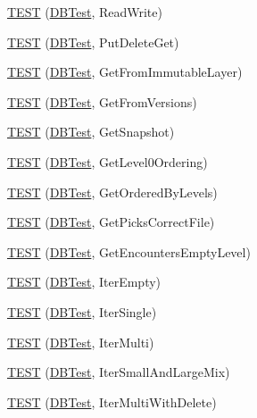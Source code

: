\begin{DoxyCompactItemize}
\hyperlink{namespaceleveldb_a2d427ecc9d7b712d8c5dd7ec8b6343fc}{T\+E\+S\+T} (\hyperlink{classleveldb_1_1_d_b_test}{D\+B\+Test}, Read\+Write)
\item 
\hyperlink{namespaceleveldb_a4d273f5f0d313440832363179e28e010}{T\+E\+S\+T} (\hyperlink{classleveldb_1_1_d_b_test}{D\+B\+Test}, Put\+Delete\+Get)
\item 
\hyperlink{namespaceleveldb_a21cac1755bd447df075909132bb964d4}{T\+E\+S\+T} (\hyperlink{classleveldb_1_1_d_b_test}{D\+B\+Test}, Get\+From\+Immutable\+Layer)
\item 
\hyperlink{namespaceleveldb_affd937ddc8c138fd0b5d020a396310c8}{T\+E\+S\+T} (\hyperlink{classleveldb_1_1_d_b_test}{D\+B\+Test}, Get\+From\+Versions)
\item 
\hyperlink{namespaceleveldb_ad6fac95495278565df640d4055b9c9f0}{T\+E\+S\+T} (\hyperlink{classleveldb_1_1_d_b_test}{D\+B\+Test}, Get\+Snapshot)
\item 
\hyperlink{namespaceleveldb_a2b333e6a496f74899c808279627f11a0}{T\+E\+S\+T} (\hyperlink{classleveldb_1_1_d_b_test}{D\+B\+Test}, Get\+Level0\+Ordering)
\item 
\hyperlink{namespaceleveldb_a8f54952904ed501131060691eb1b6970}{T\+E\+S\+T} (\hyperlink{classleveldb_1_1_d_b_test}{D\+B\+Test}, Get\+Ordered\+By\+Levels)
\item 
\hyperlink{namespaceleveldb_ac3d2a0e1b8553c3106c45ead7d6804bb}{T\+E\+S\+T} (\hyperlink{classleveldb_1_1_d_b_test}{D\+B\+Test}, Get\+Picks\+Correct\+File)
\item 
\hyperlink{namespaceleveldb_a0cec95f588ef6c5c121ac0d63eb4238f}{T\+E\+S\+T} (\hyperlink{classleveldb_1_1_d_b_test}{D\+B\+Test}, Get\+Encounters\+Empty\+Level)
\item 
\hyperlink{namespaceleveldb_a5ad106e9bbfcb5520b7dc344525f7cd2}{T\+E\+S\+T} (\hyperlink{classleveldb_1_1_d_b_test}{D\+B\+Test}, Iter\+Empty)
\item 
\hyperlink{namespaceleveldb_a8a6d5f729259c0f357f4dee533a5ce6a}{T\+E\+S\+T} (\hyperlink{classleveldb_1_1_d_b_test}{D\+B\+Test}, Iter\+Single)
\item 
\hyperlink{namespaceleveldb_a683bc77ccfd830fbe21a91c26ac91347}{T\+E\+S\+T} (\hyperlink{classleveldb_1_1_d_b_test}{D\+B\+Test}, Iter\+Multi)
\item 
\hyperlink{namespaceleveldb_a4044ccda7237640864995a0885ea6710}{T\+E\+S\+T} (\hyperlink{classleveldb_1_1_d_b_test}{D\+B\+Test}, Iter\+Small\+And\+Large\+Mix)
\item 
\hyperlink{namespaceleveldb_a3e41cdc91355438f57b9497b01c66e24}{T\+E\+S\+T} (\hyperlink{classleveldb_1_1_d_b_test}{D\+B\+Test}, Iter\+Multi\+With\+Delete)

\end{DoxyCompactItemize}
